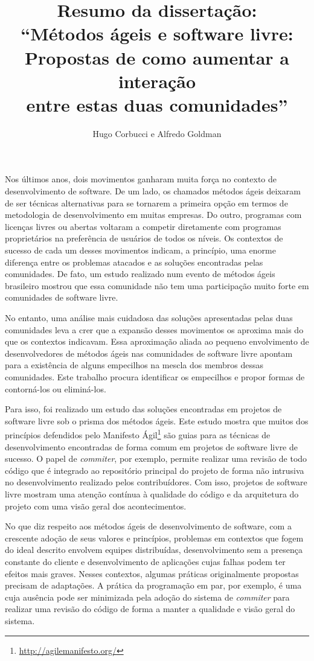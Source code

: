\documentclass[12pt]{article}
\title{Resumo da dissertação:\\
  ``Métodos ágeis e software livre:\\Propostas de como aumentar a
  interação\\ entre estas duas comunidades''}
\author{Hugo Corbucci e Alfredo Goldman}
\begin{document}
 
\maketitle

Nos últimos anos, dois movimentos ganharam muita força no contexto de
desenvolvimento de software. De um lado, os chamados métodos ágeis
deixaram de ser técnicas alternativas para se tornarem a primeira
opção em termos de metodologia de desenvolvimento em muitas
empresas. Do outro, programas com licenças livres ou abertas voltaram
a competir diretamente com programas proprietários na preferência de
usuários de todos os níveis. Os contextos de sucesso de cada um desses
movimentos indicam, a princípio, uma enorme diferença entre os
problemas atacados e as soluções encontradas pelas comunidades. De
fato, um estudo realizado num evento de métodos ágeis brasileiro
mostrou que essa comunidade não tem uma participação muito forte em
comunidades de software livre.

No entanto, uma análise mais cuidadosa das soluções apresentadas pelas
duas comunidades leva a crer que a expansão desses movimentos os
aproxima mais do que os contextos indicavam. Essa aproximação aliada
ao pequeno envolvimento de desenvolvedores de métodos ágeis nas
comunidades de software livre apontam para a existência de alguns
empecilhos na mescla dos membros dessas comunidades. Este trabalho
procura identificar os empecilhos e propor formas de contorná-los ou
eliminá-los.

Para isso, foi realizado um estudo das soluções encontradas em
projetos de software livre sob o prisma dos métodos ágeis. Este estudo
mostra que muitos dos princípios defendidos pelo Manifesto
Ágil\footnote{\href{http://agilemanifesto.org/}{http://agilemanifesto.org/}}
são guias para as técnicas de desenvolvimento encontradas de forma
comum em projetos de software livre de sucesso. O papel de {\it
  commiter}, por exemplo, permite realizar uma revisão de todo código
que é integrado ao repositório principal do projeto de forma não
intrusiva no desenvolvimento realizado pelos contribuídores. Com isso,
projetos de software livre mostram uma atenção contínua à qualidade do
código e da arquitetura do projeto com uma visão geral dos
acontecimentos.

No que diz respeito aos métodos ágeis de desenvolvimento de software,
com a crescente adoção de seus valores e princípios, problemas em
contextos que fogem do ideal descrito envolvem equipes distribuídas,
desenvolvimento sem a presença constante do cliente e desenvolvimento
de aplicações cujas falhas podem ter efeitos mais graves. Nesses
contextos, algumas práticas originalmente propostas precisam de
adaptações. A prática da programação em par, por exemplo, é uma cuja
ausência pode ser minimizada pela adoção do sistema de {\it commiter}
para realizar uma revisão do código de forma a manter a qualidade e
visão geral do sistema.
\end{document}
